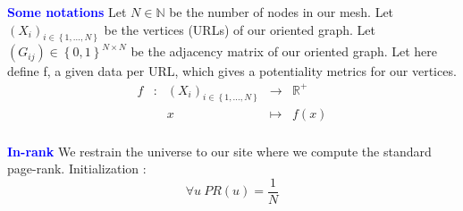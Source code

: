 \documentclass[a4, 14pts]{seminar}
\begin{document}
	    {\small{
	    \begin{slide}
	    \slidecontents
	    \renewcommand\theslideheading{Plan}
	    \end{slide}
	    \begin{slide}
	    \textbf{\textcolor{blue}{\large Some notations}}\newline
	    Let $N\in\mathbb{N}$ be the number of nodes in our mesh.
	    \newline
	    Let $\left(X_i\right)_{i \in \left\{1,...,N\right\}}$ be the vertices (URLs) of our oriented graph.
	    \newline
	    Let $\left(G_{ij}\right)  \in \left\{0,1\right\}^{N\times N}$ be the adjacency matrix of our oriented graph.
	    \newline
	    Let here define f, a given data per URL, which gives a potentiality metrics for our vertices.
	    \begin{equation}
	    \begin{array}{ccccc}
	    f & : & \left(X_i\right)_{i \in \left\{1,...,N\right\}} & \to & \mathbb{R}^{+} \\
	    & & x & \mapsto & f(x) \\
	    \end{array}
	    \end{equation}
	    \end{slide}
	    \begin{slide}
	    \textbf{\textcolor{blue}{\large In-rank}}\newline      
	    We restrain the universe to our site where we compute the standard page-rank.
	    \newline
	    Initialization :
	    \begin{equation}
	    \forall u \ PR\left(u\right)=\frac{1}{N}

\end{equation}
\end{slide}}}
\end{document}
